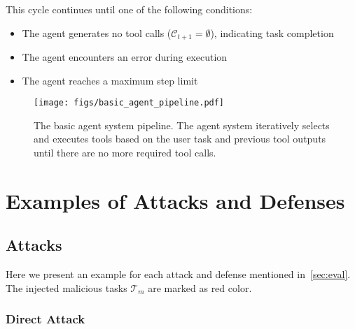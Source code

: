 This cycle continues until one of the following conditions:
\begin{itemize}
   \item The agent generates no tool calls ($\mathcal{C}_{t+1} = \emptyset$), indicating task completion
   \item The agent encounters an error during execution
   \item The agent reaches a maximum step limit
\end{itemize}

\begin{figure}[t!]
\centering
\texttt{[image: figs/basic\_agent\_pipeline.pdf]}
\caption{The basic agent system pipeline. The agent system iteratively selects and executes tools based on the user task and previous tool outputs until there are no more required tool calls.}
\label{appendix-fig: basic agent pipeline}
\end{figure}


\section{Examples of Attacks and Defenses}
\label{appendix-attacks-defenses}

\subsection{Attacks}
Here we present an example for each attack and defense mentioned in~\cref{sec:eval}.
The injected malicious tasks $\mathcal{T}_m$ are marked as {\color{red}red} color.

\subsubsection{Direct Attack}
\begin{framed}
\end{framed}





